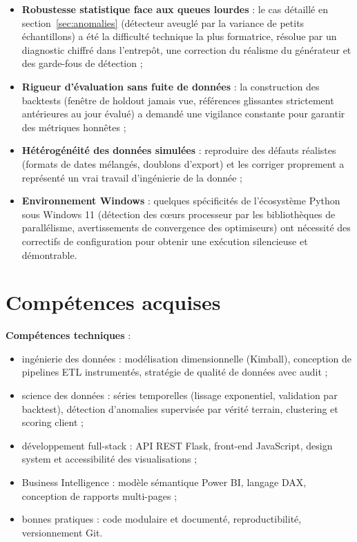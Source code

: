 \documentclass[12pt,a4paper]{report}
\begin{document}
\begin{itemize}
  \item \textbf{Robustesse statistique face aux queues lourdes} : le cas
    détaillé en section~\ref{sec:anomalies} (détecteur aveuglé par la
    variance de petits échantillons) a été la difficulté technique la plus
    formatrice, résolue par un diagnostic chiffré dans l'entrepôt, une
    correction du réalisme du générateur et des garde-fous de détection ;
  \item \textbf{Rigueur d'évaluation sans fuite de données} : la construction
    des backtests (fenêtre de holdout jamais vue, références glissantes
    strictement antérieures au jour évalué) a demandé une vigilance
    constante pour garantir des métriques honnêtes ;
  \item \textbf{Hétérogénéité des données simulées} : reproduire des défauts
    réalistes (formats de dates mélangés, doublons d'export) et les corriger
    proprement a représenté un vrai travail d'ingénierie de la donnée ;
  \item \textbf{Environnement Windows} : quelques spécificités de
    l'écosystème Python sous Windows 11 (détection des c\oe urs processeur
    par les bibliothèques de parallélisme, avertissements de convergence des
    optimiseurs) ont nécessité des correctifs de configuration pour obtenir
    une exécution silencieuse et démontrable.
\end{itemize}

\section{Compétences acquises}

\textbf{Compétences techniques} :
\begin{itemize}
  \item ingénierie des données : modélisation dimensionnelle (Kimball),
    conception de pipelines ETL instrumentés, stratégie de qualité de
    données avec audit ;
  \item science des données : séries temporelles (lissage exponentiel,
    validation par backtest), détection d'anomalies supervisée par vérité
    terrain, clustering et scoring client ;
  \item développement full-stack : API REST Flask, front-end JavaScript,
    design system et accessibilité des visualisations ;
  \item Business Intelligence : modèle sémantique Power BI, langage DAX,
    conception de rapports multi-pages ;
  \item bonnes pratiques : code modulaire et documenté, reproductibilité,
    versionnement Git.
\end{itemize}
\end{document}

